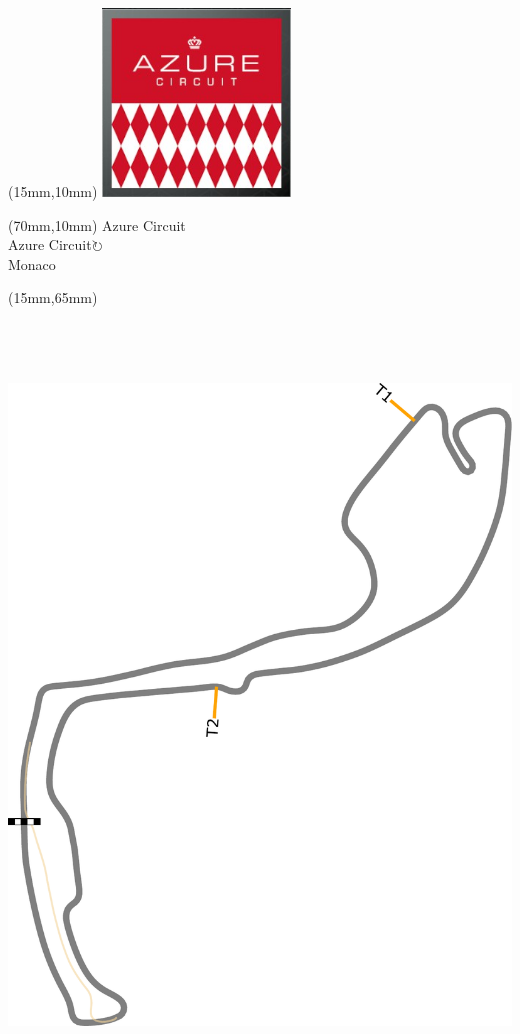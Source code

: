\null\newpage
\begin{textblock*}{50mm}(15mm,10mm)%
\includegraphics[width=50mm]{LG/2015-05-20_00072.png}
\end{textblock*}
\begin{textblock*}{130mm}(70mm,10mm)%
{\fontsize{20}{20}\selectfont Azure Circuit\\}
{\fontsize{16}{16}\selectfont Azure Circuit\hfill \Large$\circlearrowright$\\}
{\fontsize{12}{12}\selectfont Monaco\\}
\end{textblock*}
\begin{textblock*}{185mm}(15mm,65mm)%
\centering
\mbox{\includegraphics[width=185mm,height=210mm,keepaspectratio]{PT/AZCI.pdf}}
\end{textblock*}
